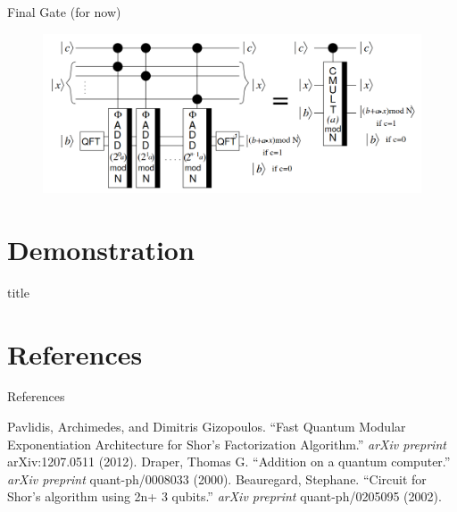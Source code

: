\documentclass{beamer}
\begin{document}
\begin{frame}{Final Gate (for now)}
	\begin{figure}[h]
		\centering
		\includegraphics[width=\linewidth]{./ua.png}
	\end{figure}
\end{frame}

\section{Demonstration}%
\label{sec:demonstration}

\begin{frame}{title}
	
\end{frame}


\section{References}
\begin{frame}{References}
\begin{thebibliography}{10}
	Pavlidis, Archimedes, and Dimitris Gizopoulos. ``Fast
		Quantum Modular Exponentiation Architecture for Shor's Factorization
		Algorithm.'' \textit{arXiv preprint} arXiv:1207.0511 (2012). 
	Draper, Thomas G. ``Addition on a quantum computer.'' 
		\textit{arXiv preprint} quant-ph/0008033 (2000). 
	Beauregard, Stephane. ``Circuit for Shor's algorithm
		using 2n+ 3 qubits.'' \textit{arXiv preprint} quant-ph/0205095 (2002). 
	
\end{thebibliography}
\end{frame} 
\end{document}
